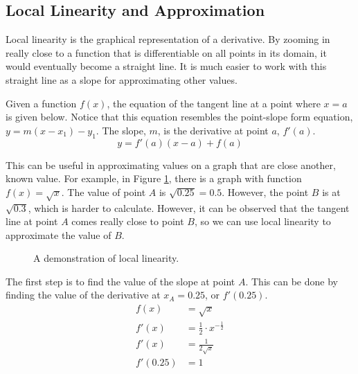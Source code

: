 \subsection{Local Linearity and Approximation}
Local linearity is the graphical representation of a derivative. By zooming in really close to a function that is differentiable on all points in its domain, it would eventually become a straight line. It is much easier to work with this straight line as a slope for approximating other values.

Given a function $f(x)$, the equation of the tangent line at a point where $x = a$ is given below. Notice that this equation resembles the point-slope form equation, $y = m(x - x_1) - y_1$. The slope, $m$, is the derivative at point $a$, $f'(a)$.
\[ y = f'(a) (x - a) + f(a) \]

This can be useful in approximating values on a graph that are close another, known value. For example, in Figure \ref{fig:linearity}, there is a graph with function $f(x) = \sqrt{x}$. The value of point $A$ is $\sqrt{0.25} = 0.5$. However, the point $B$ is at $\sqrt{0.3}$, which is harder to calculate. However, it can be observed that the tangent line at point $A$ comes really close to point $B$, so we can use local linearity to approximate the value of $B$.

\begin{figure}[H]
	\begin{center}
		\caption{A demonstration of local linearity.}
		\label{fig:linearity}
	\end{center}
\end{figure}

The first step is to find the value of the slope at point $A$. This can be done by finding the value of the derivative at $x_A = 0.25$, or $f'(0.25)$.
\begin{align*}
	f(x) &= \sqrt{x} \\
	f'(x) &= \frac{1}{2} \cdot x^{-\frac{1}{2}} \\[5pt]
	f'(x) &= \frac{1}{2 \sqrt{x}} \\[5pt]
	f'(0.25) &= 1
\end{align*}

